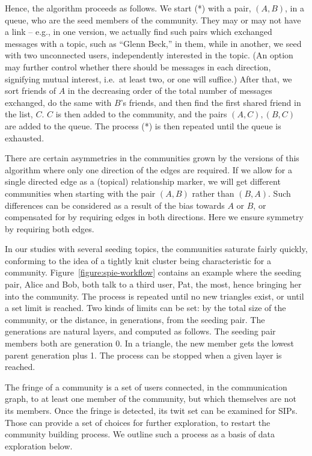 \documentclass[10pt,oneside]{memoir}
\begin{document}
\begin{Spacing}{2}
Hence, the algorithm proceeds as follows. We start (*) with a
pair, $(A,B)$, in a queue, who are the seed members of the
community. They may or may not have a link -- e.g., in one version,
we actually find such pairs which exchanged messages with a topic,
such as ``Glenn Beck,'' in them, while in another, we seed with two
unconnected users, independently interested in the topic. (An
option may further control whether there should be messages in each
direction, signifying mutual interest, i.e.\ at least two, or one
will suffice.) After that, we sort friends of $A$ in the decreasing
order of the total number of messages exchanged, do the same with
$B$'s friends, and then find the first shared friend in the list,
$C$. $C$ is then added to the community, and the pairs
$(A,C), (B,C)$ are added to the queue. The process (*) is then
repeated until the queue is exhausted.


There are certain asymmetries in the communities grown by the
versions of this algorithm where only one direction of the edges
are required. If we allow for a single directed edge as a (topical)
relationship marker, we will get different communities when
starting with the pair $(A,B)$ rather than $(B,A)$. Such
differences can be considered as a result of the bias towards $A$
or $B$, or compensated for by requiring edges in both directions.
Here we ensure symmetry by requiring both edges.


In our studies with several seeding topics, the communities
saturate fairly quickly, conforming to the idea of a tightly knit
cluster \cite{DBLP:conf/waw/MishraSST07} being characteristic for a
community. Figure~\ref{figure:spie-workflow} contains an example where the
seeding pair, Alice and Bob, both talk to a third user, Pat, the
most, hence bringing her into the community. The process is
repeated until no new triangles exist, or until a set limit is
reached. Two kinds of limits can be set: by the total size of the
community, or the distance, in generations, from the seeding pair.
The generations are natural layers, and computed as follows. The
seeding pair members both are generation 0. In a triangle, the new
member gets the lowest parent generation plus 1. The process can be
stopped when a given layer is reached.


The fringe of a community is a set of users connected, in the
communication graph, to at least one member of the community, but
which themselves are not its members. Once the fringe is detected,
its twit set can be examined for SIPs. Those can provide a set of
choices for further exploration, to restart the community building
process. We outline such a process as a basis of data exploration
below.



\end{Spacing}
\end{document}
